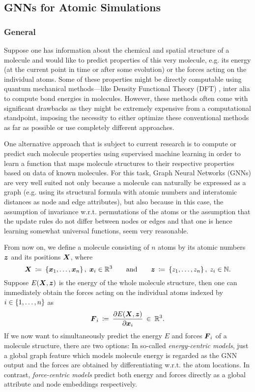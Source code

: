 \subsection{GNNs for Atomic Simulations}
\label{subsec:atomic-simulations}

\subsubsection{General}
\label{subsubsec:atomic-simulations-general}

Suppose one has information about the chemical and spatial structure of a molecule 
and would like to predict properties of this very molecule, e.g. its energy (at the 
current point in time or after some evolution) or the forces acting on the 
individual atoms. Some of these properties might be directly
computable using quantum mechanical methods---like Density Functional Theory (DFT) 
\cite{doi:10.1021/ed5004788}, inter alia
to compute bond energies in molecules. However, these methods often come
with significant drawbacks as they might be extremely expensive from a computational 
standpoint, imposing the necessity to either optimize these conventional methods 
as far as possible or use completely different approaches.

One alternative approach that is subject to current research is to compute or 
predict such molecule properties using supervised
machine learning in order to learn a function that maps molecule structures to their
respective properties based on data of known molecules. For this task, Graph
Neural Networks (GNNs) are very well suited not only because a molecule can naturally
be expressed as a graph (e.g. using its structural formula with atomic numbers and
interatomic distances as node and edge attributes), but also because in this case, the 
assumption of invariance w.r.t. permutations of the atoms or the assumption that 
the update rules do not differ between nodes or edges and that one is hence
learning somewhat universal functions, seem very reasonable.

From now on, we define a molecule consisting of $n$ atoms by its atomic numbers 
$\boldsymbol{z}$ and its positions $\boldsymbol{X}$, where
\begin{equation}
    \boldsymbol{X} \: \coloneqq \: \left\{\boldsymbol{x}_1, \dots, \boldsymbol{x}_n\right\}, \; \boldsymbol{x}_i \in \mathbb{R}^3
    \qquad \text{and} \qquad 
    \boldsymbol{z} \: \coloneqq \: \left\{z_1, \dots, z_n\right\}, \; z_i \in \mathbb{N} \text{.}
    \label{eq:molecule_setup}
\end{equation}
Suppose $E(\boldsymbol{X}, \boldsymbol{z})$ is the energy of the whole molecule structure, then one can immediately
obtain the forces acting on the individual atoms indexed by $i \in \left\{1, \dots, n\right\}$ as
\[
    \boldsymbol{F}_i \: \coloneqq \: \frac{\partial E(\boldsymbol{X}, \boldsymbol{z})}{\partial \boldsymbol{x}_i} \: \in \: \mathbb{R}^3 \text{.}
\]
If we now want to simultaneously predict the energy $E$ and forces $\boldsymbol{F}_i$
of a molecule structure, there are two options: In so-called 
\textit{energy-centric models}, just a global graph feature which models molecule energy
is regarded as the GNN output and the forces are obtained by differentiating w.r.t.
the atom locations. In contrast, \textit{force-centric models} predict both energy and forces
directly as a global attribute and node embeddings respectively.

